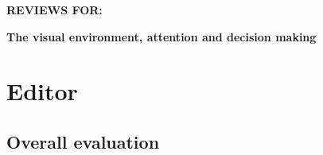 
\singlespacing
\begin{center}

{\Large \textbf{REVIEWS FOR:}}

\vspace{1cm}

{\Large \textbf{The visual environment, attention and decision making}}

\vspace{5mm}


\vspace{1cm}
\end{center}



\section{Editor}
\label{rev:editor}

\subsection{Overall evaluation}

